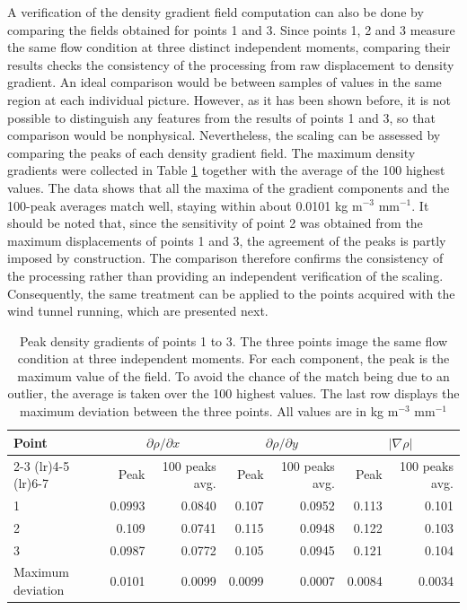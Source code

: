A verification of the density gradient field computation can also be done by comparing the fields obtained for points 1 and 3. Since points 1, 2 and 3 measure the same flow condition at three distinct independent moments, comparing their results checks the consistency of the processing from raw displacement to density gradient. An ideal comparison would be between samples of values in the same region at each individual picture. However, as it has been shown before, it is not possible to distinguish any features from the results of points 1 and 3, so that comparison would be nonphysical. Nevertheless, the scaling can be assessed by comparing the peaks of each density gradient field. The maximum density gradients were collected in Table \ref{tab: aerospike gradient peaks} together with the average of the 100 highest values. The data shows that all the maxima of the gradient components and the 100-peak averages match well, staying within about 0.0101 kg m$^{-3}$ mm$^{-1}$. It should be noted that, since the sensitivity of point 2 was obtained from the maximum displacements of points 1 and 3, the agreement of the peaks is partly imposed by construction. The comparison therefore confirms the consistency of the processing rather than providing an independent verification of the scaling. Consequently, the same treatment can be applied to the points acquired with the wind tunnel running, which are presented next.

\begin{table}[htbp]
    \centering
    \caption[Peak density gradients of three repeated acquisitions of the same flow]{Peak density gradients of points 1 to 3. The three points image the same flow condition at three independent moments. For each component, the peak is the maximum value of the field. To avoid the chance of the match being due to an outlier, the average is taken over the 100 highest values. The last row displays the maximum deviation between the three points. All values are in kg m$^{-3}$ mm$^{-1}$}
    \label{tab: aerospike gradient peaks}
    \small
    \begin{tabular}{lrrrrrr}
        \toprule
        Point & \multicolumn{2}{c}{$\partial \rho / \partial x$} & \multicolumn{2}{c}{$\partial \rho / \partial y$} & \multicolumn{2}{c}{$|\nabla \rho|$} \\
        \cmidrule(lr){2-3} \cmidrule(lr){4-5} \cmidrule(lr){6-7}
              & Peak & 100 peaks avg. & Peak & 100 peaks avg. & Peak & 100 peaks avg. \\
        \midrule
        1 & 0.0993 & 0.0840 & 0.107 & 0.0952 & 0.113 & 0.101 \\
        2 & 0.109 & 0.0741 & 0.115 & 0.0948 & 0.122 & 0.103 \\
        3 & 0.0987 & 0.0772 & 0.105 & 0.0945 & 0.121 & 0.104 \\
        \midrule
        Maximum deviation & 0.0101 & 0.0099 & 0.0099 & 0.0007 & 0.0084 & 0.0034 \\
        \bottomrule
    \end{tabular}
\end{table}

